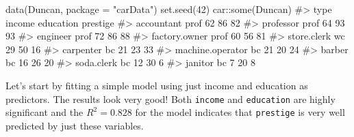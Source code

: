 \documentclass[
  letterpaper,
  10pt,
  krantz2]{krantz}
\makeatletter
\newenvironment{Shaded}{\begin{snugshade}}{\end{snugshade}}
\newcommand{\AttributeTok}[1]{\textcolor[rgb]{0.40,0.45,0.13}{#1}}
\newcommand{\CommentTok}[1]{\textcolor[rgb]{0.37,0.37,0.37}{#1}}
\newcommand{\DecValTok}[1]{\textcolor[rgb]{0.68,0.00,0.00}{#1}}
\newcommand{\FunctionTok}[1]{\textcolor[rgb]{0.28,0.35,0.67}{#1}}
\newcommand{\NormalTok}[1]{\textcolor[rgb]{0.00,0.23,0.31}{#1}}
\newcommand{\SpecialCharTok}[1]{\textcolor[rgb]{0.37,0.37,0.37}{#1}}
\newcommand{\StringTok}[1]{\textcolor[rgb]{0.13,0.47,0.30}{#1}}
\newenvironment{kframe}{%
  \medskip{}
  \setlength{\fboxsep}{.8em}
  \def\at@end@of@kframe{}%
  \ifinner\ifhmode%
  \def\at@end@of@kframe{\end{minipage}}%
  \begin{minipage}{\columnwidth}%
  \fi\fi%
  \def\FrameCommand##1{\hskip\@totalleftmargin \hskip-\fboxsep
  \colorbox{shadecolor}{##1}\hskip-\fboxsep
      \hskip-\linewidth \hskip-\@totalleftmargin \hskip\columnwidth}%
  \MakeFramed {\advance\hsize-\width
    \@totalleftmargin\z@ \linewidth\hsize
    \@setminipage}}%
{\par\unskip\endMakeFramed%
  \at@end@of@kframe}
\renewenvironment{Shaded}{\begin{kframe}}{\end{kframe}}
\makeatother
\begin{document}
\begin{Shaded}
\begin{Highlighting}[]
\FunctionTok{data}\NormalTok{(Duncan, }\AttributeTok{package =} \StringTok{"carData"}\NormalTok{)}
\FunctionTok{set.seed}\NormalTok{(}\DecValTok{42}\NormalTok{)}
\NormalTok{car}\SpecialCharTok{::}\FunctionTok{some}\NormalTok{(Duncan)}
\CommentTok{\#\textgreater{}                  type income education prestige}
\CommentTok{\#\textgreater{} accountant       prof     62        86       82}
\CommentTok{\#\textgreater{} professor        prof     64        93       93}
\CommentTok{\#\textgreater{} engineer         prof     72        86       88}
\CommentTok{\#\textgreater{} factory.owner    prof     60        56       81}
\CommentTok{\#\textgreater{} store.clerk        wc     29        50       16}
\CommentTok{\#\textgreater{} carpenter          bc     21        23       33}
\CommentTok{\#\textgreater{} machine.operator   bc     21        20       24}
\CommentTok{\#\textgreater{} barber             bc     16        26       20}
\CommentTok{\#\textgreater{} soda.clerk         bc     12        30        6}
\CommentTok{\#\textgreater{} janitor            bc      7        20        8}
\end{Highlighting}
\end{Shaded}

Let's start by fitting a simple model using just income and education as
predictors. The results look very good! Both \texttt{income} and
\texttt{education} are highly significant and the \(R^2 = 0.828\) for
the model indicates that \texttt{prestige} is very well predicted by
just these variables.
\end{document}
